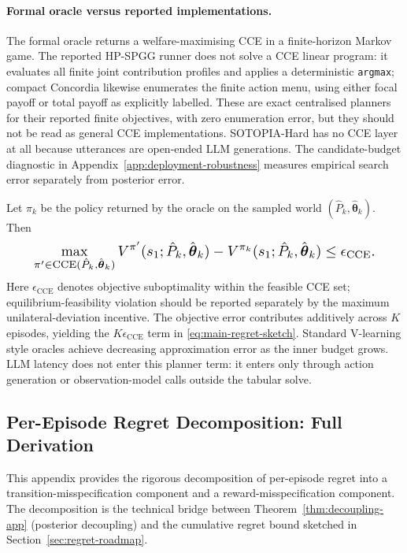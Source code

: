 \paragraph{Formal oracle versus reported implementations.} The formal oracle returns a welfare-maximising CCE in a finite-horizon Markov game. The reported HP-SPGG runner does not solve a CCE linear program: it evaluates all finite joint contribution profiles and applies a deterministic \texttt{argmax}; compact Concordia likewise enumerates the finite action menu, using either focal payoff or total payoff as explicitly labelled. These are exact centralised planners for their reported finite objectives, with zero enumeration error, but they should not be read as general CCE implementations. SOTOPIA-Hard has no CCE layer at all because utterances are open-ended LLM generations. The candidate-budget diagnostic in Appendix~\ref{app:deployment-robustness} measures empirical search error separately from posterior error.

Let $\pi_k$ be the policy returned by the oracle on the sampled world $(\hat{P}_k, \hat{\boldsymbol{\theta}}_k)$. Then
\begin{equation}\resizebox{0.9\linewidth}{!}{$\displaystyle \max_{\pi'\in\mathrm{CCE}(\hat P_k,\hat{\boldsymbol\theta}_k)} V^{\pi'}(s_1;\hat P_k,\hat{\boldsymbol\theta}_k)-V^{\pi_k}(s_1;\hat P_k,\hat{\boldsymbol\theta}_k)\leq\epsilon_{\mathrm{CCE}}. $}\end{equation}
Here $\epsilon_{\mathrm{CCE}}$ denotes objective suboptimality within the feasible CCE set; equilibrium-feasibility violation should be reported separately by the maximum unilateral-deviation incentive. The objective error contributes additively across $K$ episodes, yielding the $K\epsilon_{\mathrm{CCE}}$ term in \eqref{eq:main-regret-sketch}. Standard V-learning style oracles \citep{jin2021v} achieve decreasing approximation error as the inner budget grows. LLM latency does not enter this planner term: it enters only through action generation or observation-model calls outside the tabular solve.

\subsection{Per-Episode Regret Decomposition: Full Derivation}
\label{app:regret-decomp}

This appendix provides the rigorous decomposition of per-episode regret into a transition-misspecification component and a reward-misspecification component. The decomposition is the technical bridge between Theorem~\ref{thm:decoupling-app} (posterior decoupling) and the cumulative regret bound sketched in Section~\ref{sec:regret-roadmap}.

